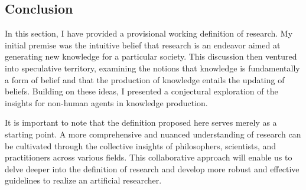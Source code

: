 

\subsection{Conclusion}
In this section, I have provided a provisional working definition of research. My initial premise was the intuitive belief that research is an endeavor aimed at generating new knowledge for a particular society. This discussion then ventured into speculative territory, examining the notions that knowledge is fundamentally a form of belief and that the production of knowledge entails the updating of beliefs. Building on these ideas, I presented a conjectural exploration of the insights for non-human agents in knowledge production.

It is important to note that the definition proposed here serves merely as a starting point. A more comprehensive and nuanced understanding of research can be cultivated through the collective insights of philosophers, scientists, and practitioners across various fields. This collaborative approach will enable us to delve deeper into the definition of research and develop more robust and effective guidelines to realize an artificial researcher.

